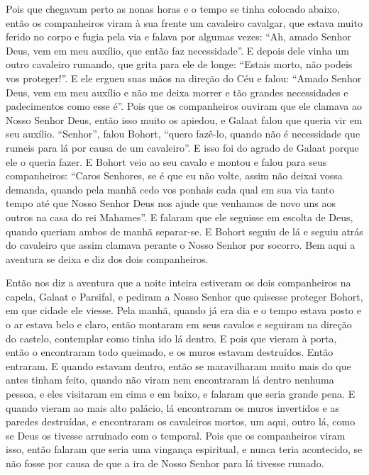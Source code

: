 Pois que chegavam perto as nonas horas e o tempo se tinha colocado abaixo, então
os companheiros viram à sua frente um cavaleiro cavalgar, que estava muito
ferido no corpo e fugia pela via e falava por algumas vezes: “Ah, amado Senhor
Deus, vem em meu auxílio, que então faz necessidade”. E depois dele vinha um
outro cavaleiro rumando, que grita para ele de longe: “Estais morto, não podeis
vos proteger!”. E ele ergueu suas mãos na direção do Céu e falou: “Amado Senhor
Deus, vem em meu auxílio e não me deixa morrer e tão grandes necessidades e
padecimentos como esse é”. Pois que os companheiros ouviram que ele clamava ao
Nosso Senhor Deus, então isso muito os apiedou, e Galaat falou que queria vir
em seu auxílio. “Senhor”, falou Bohort, “quero fazê-lo, quando não é
necessidade que rumeis para lá por causa de um cavaleiro”. E isso foi do agrado
de Galaat porque ele o queria fazer. E Bohort veio ao seu cavalo e montou e
falou para seus companheiros: “Caros Senhores, se é que eu não volte, assim não
deixai vossa demanda, quando pela manhã cedo vos ponhais cada qual em sua via
tanto tempo até que Nosso Senhor Deus nos ajude que venhamos de novo uns aos
outros na casa do rei Mahames”. E falaram que ele seguisse em escolta de Deus,
quando queriam ambos de manhã separar-se. E Bohort seguiu de lá e seguiu atrás
do cavaleiro que assim clamava perante o Nosso Senhor por socorro. Bem aqui a
aventura se deixa e diz dos dois companheiros.

Então nos diz a aventura que a noite inteira estiveram os dois companheiros na
capela, Galaat e Parsifal, e pediram a Nosso Senhor que quisesse proteger
Bohort, em que cidade ele viesse. Pela manhã, quando já era dia e o
tempo estava posto e o ar estava belo e claro, então montaram em seus cavalos e
seguiram na direção do castelo, contemplar como tinha ido lá dentro. E pois que
vieram à porta, então o encontraram todo queimado, e os muros estavam
destruídos. Então entraram. E quando estavam dentro, então se maravilharam
muito mais do que antes tinham feito, quando não viram nem encontraram lá
dentro nenhuma pessoa, e eles visitaram em cima e em baixo, e falaram que seria
grande pena. E quando vieram ao mais alto palácio, lá encontraram os muros
invertidos e as paredes destruídas, e encontraram os cavaleiros mortos, um
aqui, outro lá, como se Deus os tivesse arruinado com o temporal. Pois que os
companheiros viram isso, então falaram que seria uma vingança espiritual, e
nunca teria acontecido, se não fosse por causa de que a ira de Nosso Senhor
para lá tivesse rumado.

